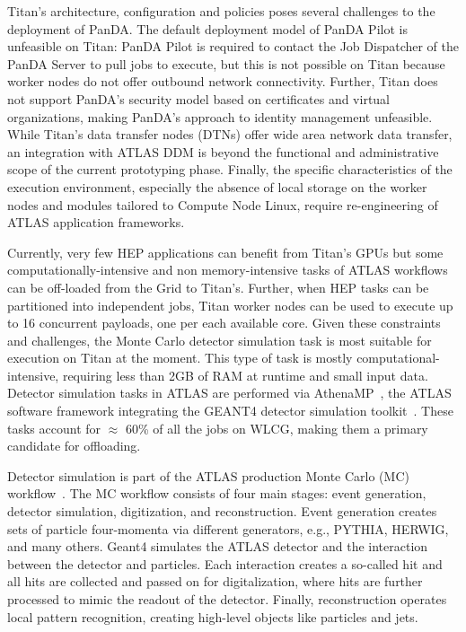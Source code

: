 Titan's architecture, configuration and policies poses several challenges to
the deployment of PanDA\@. The default deployment model of PanDA Pilot is
unfeasible on Titan: PanDA Pilot is required to contact the Job Dispatcher of
the PanDA Server to pull jobs to execute, but this is not possible on Titan
because worker nodes do not offer outbound network connectivity. Further,
Titan does not support PanDA's security model based on certificates and
virtual organizations, making PanDA's approach to identity management 
unfeasible. While Titan's data transfer nodes (DTNs) offer wide area network
data transfer, an integration with ATLAS DDM is beyond the functional and
administrative scope of the current prototyping phase. Finally, the specific
characteristics of the execution environment, especially the absence of local
storage on the worker nodes and modules tailored to Compute Node Linux,
require re-engineering of ATLAS application frameworks.

Currently, very few HEP applications can benefit from Titan's GPUs but some
computationally-intensive and non memory-intensive tasks of ATLAS workflows
can be off-loaded from the Grid to Titan's. Further, when HEP tasks can be
partitioned into independent jobs, Titan worker nodes can be used to execute
up to 16 concurrent payloads, one per each available core. Given these
constraints and challenges, the  Monte Carlo detector simulation task is most
suitable for execution on Titan at the moment. This type of task is mostly
computational-intensive, requiring less than 2GB of RAM at runtime and small
input data. Detector simulation tasks in ATLAS are performed via
AthenaMP~\cite{aad2010atlas}, the ATLAS software framework integrating the
GEANT4 detector simulation toolkit~\cite{agostinelli2003geant4}. These tasks
account for $\approx$ 60\% of all the jobs on WLCG, making them a primary
candidate for offloading.

Detector simulation is part of the ATLAS production Monte Carlo (MC)
workflow~\cite{rimoldi2006atlas}. %
The MC workflow consists of four main stages: event generation, detector
simulation, digitization, and reconstruction. Event generation creates sets
of particle four-momenta via different generators, e.g.,
PYTHIA, %
HERWIG, %
and many others. Geant4 simulates the ATLAS detector and the interaction
between the detector and particles. Each interaction creates a so-called hit
and all hits are collected and passed on for digitalization, where hits are
further processed to mimic the readout of the detector. Finally,
reconstruction operates local pattern recognition, creating high-level
objects like particles and jets.


